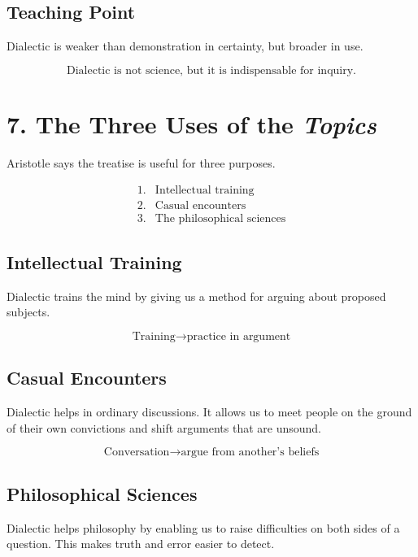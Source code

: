 \documentclass[12pt]{article}
\begin{document}
\subsection*{Teaching Point}

Dialectic is weaker than demonstration in certainty, but broader in use.

\[
\boxed{
\text{Dialectic is not science, but it is indispensable for inquiry.}
}
\]

\section*{7. The Three Uses of the \textit{Topics}}

Aristotle says the treatise is useful for three purposes.

\[
\begin{array}{ll}
1. & \text{Intellectual training} \\
2. & \text{Casual encounters} \\
3. & \text{The philosophical sciences}
\end{array}
\]

\subsection*{Intellectual Training}

Dialectic trains the mind by giving us a method for arguing about proposed
subjects.

\[
\boxed{
\text{Training} \rightarrow \text{practice in argument}
}
\]

\subsection*{Casual Encounters}

Dialectic helps in ordinary discussions. It allows us to meet people on the
ground of their own convictions and shift arguments that are unsound.

\[
\boxed{
\text{Conversation} \rightarrow \text{argue from another's beliefs}
}
\]

\subsection*{Philosophical Sciences}

Dialectic helps philosophy by enabling us to raise difficulties on both sides
of a question. This makes truth and error easier to detect.
\end{document}
